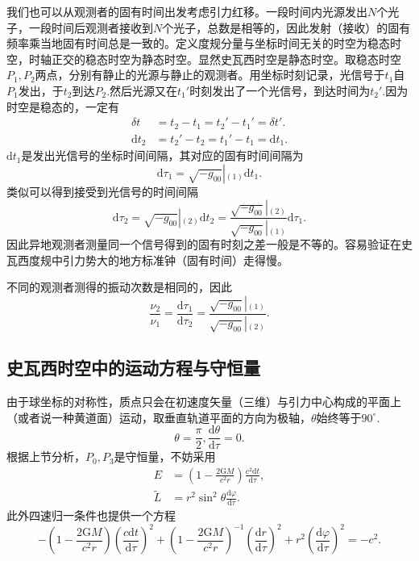 \documentclass[11pt, a4paper, oneside, onecolumn]{ctexart}
\numberwithin{equation}{subsection}
\begin{document}
我们也可以从观测者的固有时间出发考虑引力红移。一段时间内光源发出$N$个光子，一段时间后观测者接收到$N$个光子，总数是相等的，因此发射（接收）的固有频率乘当地固有时间总是一致的。定义度规分量与坐标时间无关的时空为稳态时空，时轴正交的稳态时空为静态时空。显然史瓦西时空是静态时空。取稳态时空$P_{1},P_{2}$两点，分别有静止的光源与静止的观测者。用坐标时刻记录，光信号于$t_{1}$自$P_{1}$发出，于$t_{2}$到达$P_{2}$.然后光源又在$t_{1}'$时刻发出了一个光信号，到达时间为$t_{2}'$.因为时空是稳态的，一定有
\begin{align}
\delta{}t&=t_{2}-t_{1}=t_{2}'-t_{1}'=\delta{}t'.\\
\mathrm{d}t_{2}&=t_{2}'-t_{2}=t_{1}'-t_{1}=\mathrm{d}t_{1}.
\end{align}
$\mathrm{d}t_{1}$是发出光信号的坐标时间间隔，其对应的固有时间间隔为
\begin{equation}
\mathrm{d}\tau_{1}=\left.\sqrt{-g_{00}}\right\vert{}_{\left(1\right)}\mathrm{d}t_{1}.
\end{equation}
类似可以得到接受到光信号的时间间隔
\begin{equation}
\mathrm{d}\tau_{2}=\left.\sqrt{-g_{00}}\right\vert{}_{\left(2\right)}\mathrm{d}t_{2}=\frac{\left.\sqrt{-g_{00}}\right\vert{}_{\left(2\right)}}{\left.\sqrt{-g_{00}}\right\vert{}_{\left(1\right)}}\mathrm{d}\tau_{1}.
\end{equation}
因此异地观测者测量同一个信号得到的固有时刻之差一般是不等的。容易验证在史瓦西度规中引力势大的地方标准钟（固有时间）走得慢。

不同的观测者测得的振动次数是相同的，因此
\begin{equation}
\frac{\nu_{2}}{\nu_{1}}=\frac{\mathrm{d}\tau_{1}}{\mathrm{d}\tau_{2}}=\frac{\left.\sqrt{-g_{00}}\right\vert{}_{\left(1\right)}}{\left.\sqrt{-g_{00}}\right\vert{}_{\left(2\right)}}.
\end{equation}

\subsection{史瓦西时空中的运动方程与守恒量}
由于球坐标的对称性，质点只会在初速度矢量（三维）与引力中心构成的平面上（或者说一种黄道面）运动，取垂直轨道平面的方向为极轴，$\theta$始终等于$90^{\circ}$.
\begin{equation}
\theta=\frac{\pi}{2},\frac{\mathrm{d}\theta}{\mathrm{d}\tau}=0.
\end{equation}
根据上节分析，$P_{0},P_{3}$是守恒量，不妨采用
\begin{align}
E&=\left(1-\frac{2\mathrm{G}M}{c^{2}r}\right)\frac{c^{2}\mathrm{d}t}{\mathrm{d}\tau},\\
\widetilde{L}&=r^{2}\sin^{2}\theta\frac{\mathrm{d}\varphi}{\mathrm{d}\tau}.
\end{align}
此外四速归一条件也提供一个方程
\begin{equation}
-\left(1-\frac{2\mathrm{G}M}{c^{2}r}\right)\left(\frac{c\mathrm{d}t}{\mathrm{d}\tau}\right)^{2}+\left(1-\frac{2\mathrm{G}M}{c^{2}r}\right)^{-1}\left(\frac{\mathrm{d}r}{\mathrm{d}\tau}\right)^{2}+r^{2}\left(\frac{\mathrm{d}\varphi}{\mathrm{d}\tau}\right)^{2}=-c^{2}.\label{4.4.4}
\end{equation}
\end{document}
